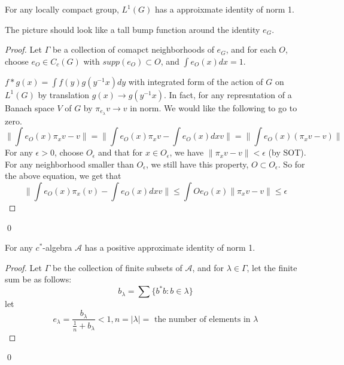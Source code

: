 \begin{proposition}
    For any locally compact group, $L^1(G)$ has a approixmate identity of norm 1.
\end{proposition}
\begin{note}
    The picture should look like a tall bump function around the identity $e_G$.
\end{note}
\begin{proof}
    Let $\Gamma$ be a collection of comapct neighborhoods of $e_G$, and for each $O$, choose $e_O\in C_c(G)$ with $supp(e_O)\subset O$, and $\int e_O(x)dx=1$.

    $f\ast g(x)=\int f(y)g(y^{-1}x)dy$ with integrated form of the action of $G$ on $L^1(G)$ by translation $g(x)\to g(y^{-1}x)$. In fact, for any represntation of a Banach space $V$ of $G$ by $\pi_{e_\lambda}v\to v$ in norm. We would like the following to go to zero.
    \begin{equation*}
        \|\int e_O(x)\pi_xv-v\|=\|\int e_O(x)\pi_xv-\int e_O(x)dx v\|=\|\int e_O(x)(\pi_xv-v)\|
    \end{equation*}
    For any $\epsilon>0$, choose $O_\epsilon$ and that for $x\in O_\epsilon$, we have $\|\pi_xv-v\|<\epsilon$ (by SOT). For any neighborhood smaller than $O_\epsilon$, we still have this property, $O\subset O_\epsilon$.
    So for the above equation, we get that
    \begin{equation*}
        \|\int e_O(x)\pi_x(v)-\int e_O(x)dxv\|\leq\int Oe_O(x)\|\pi_xv-v\|\leq\epsilon
    \end{equation*}
\end{proof}
\qed

\begin{proposition}
    For any $c^*$-algebra $\mathcal{A}$ has a positive approximate identity of norm 1.
\end{proposition}
\begin{proof}
    Let $\Gamma$ be the collection of finite subsets of $\mathcal{A}$, and for $\lambda\in\Gamma$, let the finite sum be as follows:
    \begin{equation*}
        b_\lambda=\sum\{b^*b: b\in\lambda\}
    \end{equation*}
    let
    \begin{equation*}
        e_\lambda=\frac{b_\lambda}{\frac{1}{n}+b_\lambda}<1, n=|\lambda|=\text{ the number of elements in }\lambda
    \end{equation*}
\end{proof}
\qed

